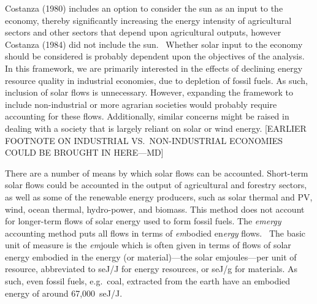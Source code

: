 Costanza (1980) includes an option to consider 
the sun as an input to the economy, 
thereby significantly increasing the energy intensity 
of agricultural sectors and other sectors 
that depend upon agricultural outputs, 
however Costanza (1984) did not include 
the sun.~\cite{Costanza:1980ww,Costanza:1984tq}
Whether solar input to the economy 
should be considered is probably dependent upon 
the objectives of the analysis. 
In this framework, we are primarily interested 
in the effects of declining energy resource quality in industrial economies, 
due to depletion of fossil fuels. 
As such, inclusion of solar flows is unnecessary. 
However, expanding the framework to include non-industrial 
or more agrarian societies would probably require accounting for these flows. 
Additionally, similar concerns might be raised 
in dealing with a society that is largely reliant on solar or wind energy.   
[EARLIER FOOTNOTE ON INDUSTRIAL VS.\ 
NON-INDUSTRIAL ECONOMIES COULD BE BROUGHT IN HERE---MD]

There are a number of means by which solar flows can be accounted. 
Short-term solar flows could be accounted 
in the output of agricultural and forestry sectors, 
as well as some of the renewable energy producers, 
such as solar thermal and PV, 
wind, 
ocean thermal, 
hydro-power, and 
biomass. 
This method does not account for longer-term flows 
of solar energy used to form fossil fuels. 
The \emph{emergy} accounting method puts all flows 
in terms of \emph{em}bodied en\emph{ergy} flows.~\cite{Odum1975, Odum1996}
The basic unit of measure is 
the \emph{em}joule which is often given in terms 
of flows of solar energy embodied in 
the energy (or material)---the solar emjoules---per unit of resource, 
abbreviated to seJ/J for energy resources, 
or seJ/g for materials. 
As such, even fossil fuels, e.g.\ coal, 
extracted from the earth have an embodied energy 
of around 67,000~seJ/J.~\cite{Brown2004} 








